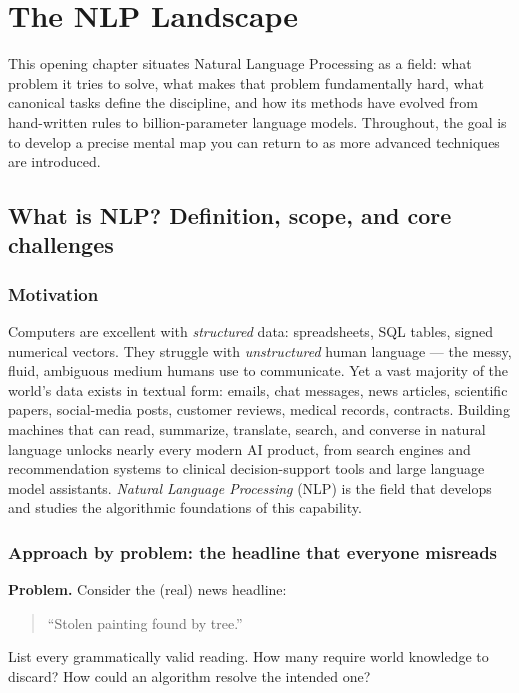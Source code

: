 \chapter{The NLP Landscape}

This opening chapter situates Natural Language Processing as a field: what problem it tries to solve, what makes that problem fundamentally hard, what canonical tasks define the discipline, and how its methods have evolved from hand-written rules to billion-parameter language models. Throughout, the goal is to develop a precise mental map you can return to as more advanced techniques are introduced.

\section{What is NLP? Definition, scope, and core challenges}

\subsection{Motivation}
Computers are excellent with \emph{structured} data: spreadsheets, SQL tables, signed numerical vectors. They struggle with \emph{unstructured} human language --- the messy, fluid, ambiguous medium humans use to communicate. Yet a vast majority of the world's data exists in textual form: emails, chat messages, news articles, scientific papers, social-media posts, customer reviews, medical records, contracts. Building machines that can read, summarize, translate, search, and converse in natural language unlocks nearly every modern AI product, from search engines and recommendation systems to clinical decision-support tools and large language model assistants. \emph{Natural Language Processing} (NLP) is the field that develops and studies the algorithmic foundations of this capability.

\subsection{Approach by problem: the headline that everyone misreads}
\textbf{Problem.} Consider the (real) news headline:
\begin{quote}
``Stolen painting found by tree.''
\end{quote}
List every grammatically valid reading. How many require world knowledge to discard? How could an algorithm resolve the intended one?

